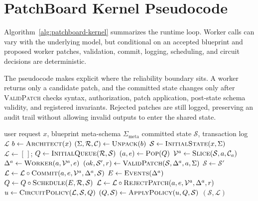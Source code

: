 \documentclass[11pt]{article}
\newcommand{\method}{PatchBoard}
\newcommand{\state}{\mathcal{S}}
\newcommand{\schema}{\Sigma}
\newcommand{\metaschema}{\Sigma_{\mathrm{meta}}}
\newcommand{\rules}{\mathcal{R}}
\newcommand{\patch}{\Delta}
\newcommand{\view}{\mathcal{V}}
\begin{document}



\newpage
\appendix

\section{\method{} Kernel Pseudocode}
\label{app:pseudocode}

Algorithm~\ref{alg:patchboard-kernel} summarizes the runtime loop. Worker calls can vary with the underlying model, but conditional on an accepted blueprint and proposed worker patches, validation, commit, logging, scheduling, and circuit decisions are deterministic.

The pseudocode makes explicit where the reliability boundary sits. A worker returns only a candidate patch, and the committed state changes only after \textsc{ValidPatch} checks syntax, authorization, patch application, post-state schema validity, and registered invariants. Rejected patches are still logged, preserving an audit trail without allowing invalid outputs to enter the shared state.

\begin{algorithm}[htpb]
\small
\caption{\method{} runtime kernel}
\label{alg:patchboard-kernel}
\begin{algorithmic}[1]
\Require user request $x$, blueprint meta-schema $\metaschema$
\Ensure committed state $\state$, transaction log $\mathcal{L}$
\State $b \gets \Call{Architect}{x}$
\If{\textbf{not} \Call{ValidBlueprint}{$b,\metaschema$}}
    \State \Return {}
\EndIf
\State $(\schema,\rules,\mathcal{C}) \gets \Call{Unpack}{b}$
\State $\state \gets \Call{InitialState}{x,\schema}$
\State $\mathcal{L} \gets [\,]$; $Q \gets \Call{InitialQueue}{\rules,\state}$
    \State $(a,e) \gets \Call{Pop}{Q}$
    \State $\view^a \gets \Call{Slice}{\state,a,\mathcal{C}_a}$
    \State $\patch^a \gets \Call{Worker}{a,\view^a,e}$
    \State $(ok,\state',r) \gets \Call{ValidPatch}{\state,\patch^a,a,\schema}$
        \State $\state \gets \state'$
        \State $\mathcal{L} \gets \mathcal{L} \circ \Call{Commit}{a,e,\view^a,\patch^a,\state}$
        \State $E \gets \Call{Events}{\patch^a}$
        \State $Q \gets Q \circ \Call{Schedule}{E,\rules,\state}$
    \Else
        \State $\mathcal{L} \gets \mathcal{L} \circ \Call{RejectPatch}{a,e,\view^a,\patch^a,r}$
    \EndIf
    \State $u \gets \Call{CircuitPolicy}{\mathcal{L},\state,Q}$
    \State $(Q,\state) \gets \Call{ApplyPolicy}{u,Q,\state}$
\EndWhile
\State \Return $(\state,\mathcal{L})$
\end{algorithmic}
\end{algorithm}
\end{document}
